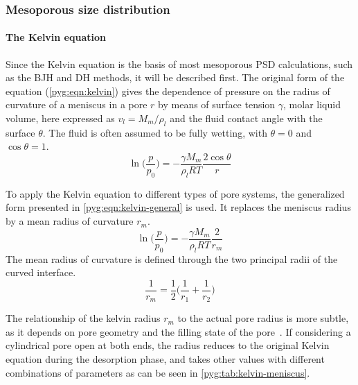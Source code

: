 \subsubsection{Mesoporous size distribution}

\paragraph{The Kelvin equation}

Since the Kelvin equation is the basis of most mesoporous PSD
calculations, such as the BJH and DH methods, it will be described
first. The original form of the equation (\autoref{pyg:eqn:kelvin})
gives the dependence of pressure on the radius of curvature of a
meniscus in a pore \(r\) by means of surface tension \( \gamma \),
molar liquid volume, here expressed as \(v_l=M_m/\rho_l\) and the
fluid contact angle with the surface
\( \theta \). The fluid is often assumed to be fully wetting, with
\(\theta=0\) and \(\cos\theta=1\).
%
\begin{equation}\label{pyg:eqn:kelvin}
	\ln\Big(\frac{p}{p_0}\Big) = -\frac{\gamma M_m}{\rho_l RT}\frac{2 \cos\theta}{r}
\end{equation}

To apply the Kelvin equation to different types of pore systems, the
generalized form presented in \autoref{pyg:eqn:kelvin-general}
is used. It replaces the meniscus radius by a mean radius of curvature
\(r_m\).
%
\begin{equation}\label{pyg:eqn:kelvin-general}
	\ln\Big(\frac{p}{p_0}\Big) = -\frac{\gamma M_m}{\rho_l RT}\frac{2}{r_m}
\end{equation}
%
The mean radius of curvature is defined through the two principal
radii of the curved interface.
%
\begin{equation}\label{pyg:eqn:kelvin-mradius}
	\frac{1}{r_m} = \frac{1}{2}\Big(\frac{1}{r_1}+\frac{1}{r_2}\Big)
\end{equation}

The relationship of the kelvin radius \(r_m\) to the actual pore
radius is more subtle, as it depends on pore geometry and the
filling state of the pore~\cite{doAdsorptionAnalysisEquilibria1998}.
If considering a cylindrical pore open at both ends, the radius reduces
to the original Kelvin equation during the desorption phase, and takes
other values with different combinations of parameters
as can be seen in \autoref{pyg:tab:kelvin-meniscus}.

